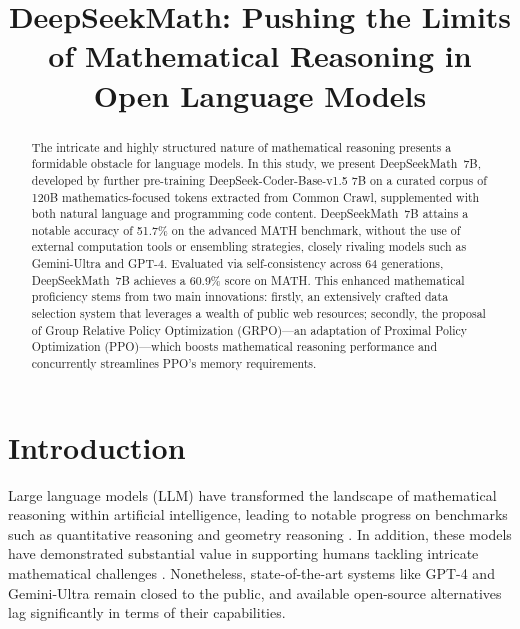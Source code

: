 \title{DeepSeekMath: Pushing the Limits of Mathematical Reasoning in Open Language Models}

\begin{abstract}
The intricate and highly structured nature of mathematical reasoning presents a formidable obstacle for language models. In this study, we present DeepSeekMath~7B, developed by further pre-training DeepSeek-Coder-Base-v1.5 7B on a curated corpus of 120B mathematics-focused tokens extracted from Common Crawl, supplemented with both natural language and programming code content. DeepSeekMath~7B attains a notable accuracy of 51.7\% on the advanced MATH benchmark, without the use of external computation tools or ensembling strategies, closely rivaling models such as Gemini-Ultra and GPT-4. Evaluated via self-consistency across 64 generations, DeepSeekMath~7B achieves a 60.9\% score on MATH. This enhanced mathematical proficiency stems from two main innovations: firstly, an extensively crafted data selection system that leverages a wealth of public web resources; secondly, the proposal of Group Relative Policy Optimization (GRPO)—an adaptation of Proximal Policy Optimization (PPO)—which boosts mathematical reasoning performance and concurrently streamlines PPO's memory requirements.
\end{abstract}

\section{Introduction}

Large language models (LLM) have transformed the landscape of mathematical reasoning within artificial intelligence, leading to notable progress on benchmarks such as quantitative reasoning \citep{MATH} and geometry reasoning \citep{trinh2024solving}. In addition, these models have demonstrated substantial value in supporting humans tackling intricate mathematical challenges \citep{tao}. Nonetheless, state-of-the-art systems like GPT-4 \citep{gpt4} and Gemini-Ultra \citep{gemini} remain closed to the public, and available open-source alternatives lag significantly in terms of their capabilities.

